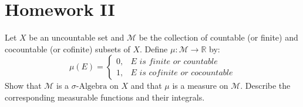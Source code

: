 \documentclass[crop=false,class=article]{standalone}                           %
\begin{document}
    \section{Homework II}
        \begin{problem}
            Let $X$ be an uncountable set and $\mathcal{M}$ be the collection of
            countable (or finite) and cocountable (or cofinite) subsets of $X$.
            Define $\mu:\mathcal{M}\rightarrow\mathbb{R}$ by:
            \begin{equation}
                \mu(E)=
                \begin{cases}
                    0,&E\textit{ is finite or countable}\\
                    1,&E\textit{ is cofinite or cocountable}
                \end{cases}
            \end{equation}
            Show that $\mathcal{M}$ is a $\sigma\textrm{-Algebra}$ on $X$ and
            that $\mu$ is a measure on $\mathcal{M}$. Describe the corresponding
            measurable functions and their integrals.
        \end{problem}
\end{document}

